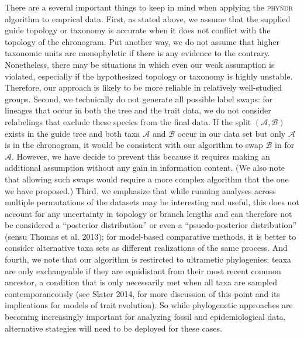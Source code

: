 \documentclass[a4paper,11pt]{article}
\begin{document}
There are a several important things to keep in mind when applying the \textsc{phyndr} algorithm to emprical data. First, as stated above, we assume that the supplied guide topology or taxonomy is accurate when it does not conflict with the topology of the chronogram. Put another way, we do not assume that higher taxonomic units are monophyletic if there is any evidence to the contrary. Nonetheless, there may be situations in which even our weak assumption is violated, especially if the hypothesized topology or taxonomy is highly unstable. Therefore, our approach is likely to be more reliable in relatively well-studied groups. Second, we technically do not generate all possible label swaps: for lineages that occur in both the tree and the trait data, we do not consider relabelings that exclude these species from the final data. If the split $(\mathcal{A,B})$ exists in the guide tree and both taxa $\mathcal{A}$ and $\mathcal{B}$ occur in our data set but only $\mathcal{A}$ is in the chronogram, it would be consistent with our algorithm to swap $\mathcal{B}$ in for $\mathcal{A}$. However, we have decide to prevent this because it requires making an additional assumption without any gain in information content. (We also note that allowing such swaps would require a more complex algorithm that the one we have proposed.) Third, we emphasize that while running analyses across multiple permutations of the datasets may be interesting and useful, this does not account for any uncertainty in topology or branch lengths and can therefore not be considered a ``posterior distribution'' or even a ``psuedo-posterior distribution'' (sensu Thomas et al. 2013); for model-based comparative methods, it is better to consider alternative taxa sets as different realizations of the same process. And fourth, we note that our algorithm is restircted to ultrametic phylogenies; teaxa are only exchangeable if they are equidistant from their most recent common ancestor, a condition that is only necessarily met when all taxa are sampled contemporaneously (see Slater 2014, for more discussion of this point and its implications for models of trait evolution). So while phylogenetic approaches are becoming increasingly important for analyzing fossil and epidemiological data, alternative stategies will need to be deployed for these cases.
\end{document}
